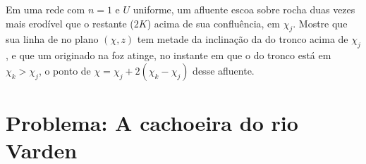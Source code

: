 \begin{exercise}[$\star\star\star$]\label{exo:b3:quantitative-geomorphology:12}
Em uma rede com $n = 1$ e $U$ uniforme, um afluente escoa sobre rocha duas
vezes mais erodível que o restante ($2K$) acima de sua confluência, em $\chi_j$. Mostre que
sua linha de  no plano $(\chi, z)$ tem metade da inclinação da
do tronco acima de $\chi_j$, e que um  originado na foz atinge,
no instante em que o  do tronco está em $\chi_k > \chi_j$, o ponto
de $\chi = \chi_j + 2(\chi_k - \chi_j)$ desse afluente.
\end{exercise}

\section{Problema: A cachoeira do rio Varden}

